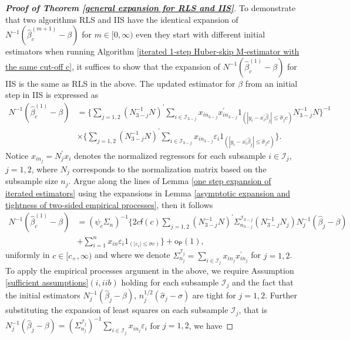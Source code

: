 \documentclass[11pt, letterpaper]{article}
\numberwithin{algorithm}{section}
\numberwithin{assumption}{section}
\numberwithin{lemma}{section}
\numberwithin{theorem}{section}
\numberwithin{corollary}{section}
\numberwithin{remark}{section}
\numberwithin{equation}{section}
\numberwithin{figure}{section}
\numberwithin{table}{section}
\begin{document}
\begin{proof}[\textnormal{\textbf{Proof of Theorem \ref{general expansion for RLS and IIS}}}]
To demonstrate that two algorithms RLS and IIS have the identical expansion of $N^{-1} (\widehat{\beta}_{c}^{(m + 1)} - \beta)$ for $m \in [0, \infty)$ even they start with different initial estimators when running Algorithm \ref{iterated 1-step Huber-skip M-estimator with the same cut-off c}, it suffices to show that the expansion of $N^{-1} (\widehat{\beta}_{c}^{(1)} - \beta)$ for IIS is the same as RLS in the above. The updated estimator for $\beta$ from an initial step in IIS is expressed as
\begin{align*}
N^{-1} (\widehat{\beta}_{c}^{(1)} - \beta) & = \{ \sum_{j = 1, 2} (N_{3 - j}^{-1} N)^{\prime} \sum_{i \in \mathcal{I}_{3 - j}} x_{i n_{3 - j}} x_{i n_{3 - j}}^{\prime} 1_{(|y_{i} - x_{i}^{\prime} \widehat{\beta}_{j}| \le \widehat{\sigma}_{j} c)} N_{3 - j}^{-1} N \}^{-1} \\
& \times \{ \sum_{j = 1, 2} (N_{3 - j}^{-1} N)^{\prime} \sum_{i \in \mathcal{I}_{3 - j}} x_{i n_{3 - j}} \varepsilon_{i} 1_{(|y_{i} - x_{i}^{\prime} \widehat{\beta}_{j}| \le \widehat{\sigma}_{j} c)} \}.
\end{align*}
Notice $x_{i n_{j}} = N^{\prime}_{j} x_{i}$ denotes the normalized regressors for each subsample $i \in \mathcal{I}_{j}$, $j = 1, 2$, where $N_{j}$ corresponds to the normalization matrix based on the subsample size $n_{j}$.
Argue along the lines of Lemma \ref{one step expansion of iterated estimators} using the expansions in Lemma \ref{asymptotic expansion and tightness of two-sided empirical processes}, then it follows
\begin{align*}
N^{-1} (\widehat{\beta}_{c}^{(1)} - \beta) & = (\psi_{c} \Sigma_{n})^{-1} \{ 2 c \mathsf{f}(c) \sum_{j = 1, 2} (N_{3 - j}^{-1} N)^{\prime} \Sigma_{n_{3 - j}}^{\mathcal{I}_{3 - j}} (N_{3 - j}^{-1} N_{j}) N_{j}^{-1} (\widehat{\beta}_{j} - \beta) \\
& + \sum_{i = 1}^{n} x_{i n} \varepsilon_{i} 1_{(|\varepsilon_{i}| \le \sigma c)} \} + \mathrm{o}_{\mathsf{P}}(1),
\end{align*}
uniformly in $c \in [c_{+}, \infty)$ and where we denote $\Sigma_{n_{j}}^{\mathcal{I}_{j}} = \sum_{i \in \mathcal{I}_{j}} x_{i n_{j}} x_{i n_{j}}^{\prime}$ for $j = 1, 2$. To apply the empirical processes argument in the above, we require Assumption \ref{sufficient assumptions}$(i, iib)$ holding for each subsample $\mathcal{I}_{j}$ and the fact that the initial estimators $N_{j}^{-1} (\widehat{\beta}_{j} - \beta)$, $n_{j}^{1/2} (\widehat{\sigma}_{j} - \sigma)$ are tight for $j = 1, 2$. Further substituting the expansion of least squares on each subsample $\mathcal{I}_{j}$, that is $N_{j}^{-1} (\widehat{\beta}_{j} - \beta) = (\Sigma_{n_{j}}^{\mathcal{I}_{j}})^{-1} \sum_{i \in \mathcal{I}_{j}} x_{i n_{j}} \varepsilon_{i}$ for $j = 1, 2$, we have

\end{proof}
\end{document}

